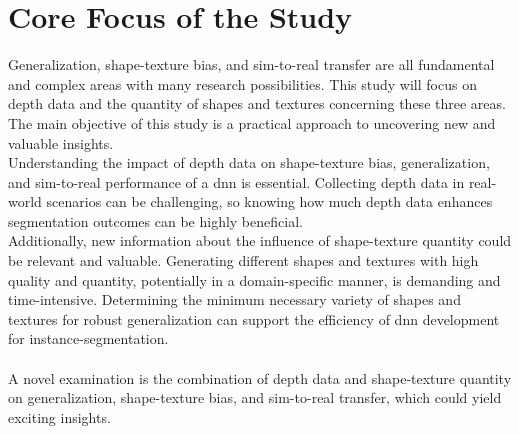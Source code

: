 	\section{Core Focus of the Study}    %
	\label{sec:core-focus-of-the-study}
		Generalization, shape-texture bias, and sim-to-real transfer are all fundamental and complex areas with many research possibilities. This study will focus on depth data and the quantity of shapes and textures concerning these three areas. The main objective of this study is a practical approach to uncovering new and valuable insights.\\
		Understanding the impact of depth data on shape-texture bias, generalization, and sim-to-real performance of a \ac{dnn} is essential. Collecting depth data in real-world scenarios can be challenging, so knowing how much depth data enhances segmentation outcomes can be highly beneficial.\\
		Additionally, new information about the influence of shape-texture quantity could be relevant and valuable. Generating different shapes and textures with high quality and quantity, potentially in a domain-specific manner, is demanding and time-intensive. Determining the minimum necessary variety of shapes and textures for robust generalization can support the efficiency of \ac{dnn} development for instance-segmentation.\\
		\\
		A novel examination is the combination of depth data and shape-texture quantity on generalization, shape-texture bias, and sim-to-real transfer, which could yield exciting insights.
		
	
	
